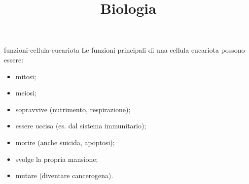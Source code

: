 \documentclass[preview]{standalone}
\begin{document}
\title{Biologia}
\genpage

\begin{snippet}{funzioni-cellula-eucariota}
    Le funzioni principali di una cellula eucariota possono essere:

    \begin{itemize}
        \item mitosi;
        \item meiosi;
        \item sopravvive (nutrimento, respirazione);
        \item essere uccisa (es. dal sistema immunitario);
        \item morire (anche suicida, apoptosi);
        \item svolge la propria mansione;
        \item mutare (diventare cancerogena).
    \end{itemize}
\end{snippet}
\end{document}
